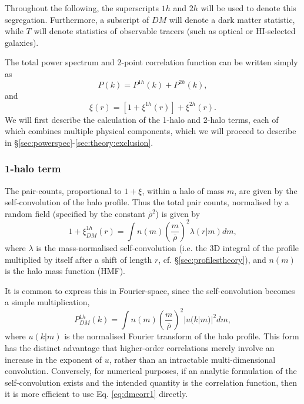 \documentclass[5p]{elsarticle}
\begin{document}
Throughout the following, the superscripts $1h$ and $2h$ will be used to denote this segregation. Furthermore, a subscript of $DM$ will denote a dark matter statistic, while $T$ will denote statistics of observable tracers (such as optical or HI-selected galaxies). 

The total power spectrum and 2-point correlation function can be written simply as
\begin{equation}
    P(k) = P^{1h}(k) + P^{2h}(k),
\end{equation}
and
\begin{equation}
    \xi(r) = [1 + \xi^{1h}(r)] + \xi^{2h}(r).
\end{equation}
We will first describe the calculation of the 1-halo and 2-halo terms, each of which combines multiple physical components, which we will proceed to describe in 
\S\ref{sec:powerspec}-\ref{sec:theory:exclusion}.

\subsubsection{1-halo term}
The pair-counts, proportional to $1+\xi$, within a halo of mass $m$, are given by the self-convolution of the halo profile. Thus the total pair counts, normalised by a random field (specified by the constant $\bar{\rho}^2$) is given by
\begin{equation}
\label{eq:dmcorr1}
1 + \xi_{DM}^{1h}(r) = \int n(m) \left(\frac{m}{\bar{\rho}}\right)^2 \lambda(r|m) dm,
\end{equation}
where $\lambda$ is the mass-normalised self-convolution (i.e. the 3D integral of the profile multiplied by itself after a shift of length $r$, cf. \S\ref{sec:profilestheory}), and $n(m)$ is the halo mass function (HMF).

It is common to express this in Fourier-space, since the self-convolution becomes a simple multiplication,
\begin{equation}
    \label{eq:dmpower1}
    P_{DM}^{1h}(k) = \int n(m) \left(\frac{m}{\bar{\rho}}\right)^2 |u(k|m)|^2 dm,
\end{equation} 
where $u(k|m)$ is the normalised Fourier transform of the halo profile. This form has the distinct advantage that higher-order correlations merely involve an increase in the exponent of $u$, rather than an intractable multi-dimensional convolution. Conversely, for numerical purposes, if an analytic formulation of the self-convolution exists and the intended quantity is the correlation function, then it is more efficient to use Eq. \ref{eq:dmcorr1} directly. 
\end{document}
